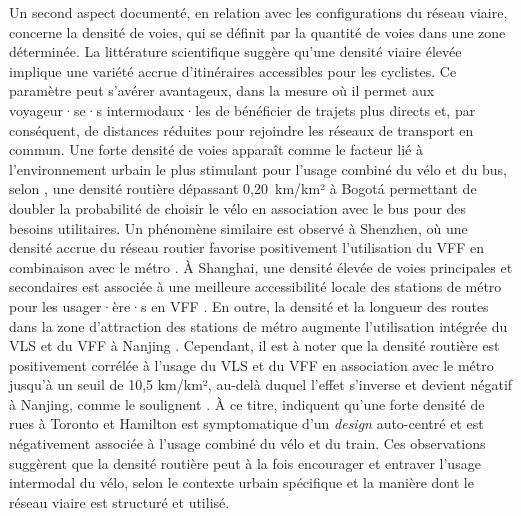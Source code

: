 \begin{refsegment}
Un second aspect documenté, en relation avec les configurations du réseau viaire, concerne la densité de voies, qui se définit par la quantité de voies dans une zone déterminée. La littérature scientifique suggère qu'une densité viaire élevée implique une variété accrue d'itinéraires accessibles pour les cyclistes. Ce paramètre peut s'avérer avantageux, dans la mesure où il permet aux voyageur·se·s intermodaux·les de bénéficier de trajets plus directs et, par conséquent, de distances réduites pour rejoindre les réseaux de transport en commun. Une forte densité de voies apparaît comme le facteur lié à l'environnement urbain le plus stimulant pour l'usage combiné du vélo et du bus, selon \textcolor{blue}{\textcite[219]{cervero_influences_2009}}, une densité routière dépassant 0,20~km/km² à Bogotá permettant de doubler la probabilité de choisir le vélo en association avec le bus pour des besoins utilitaires. Un phénomène similaire est observé à Shenzhen, où une densité accrue du réseau routier favorise positivement l'utilisation du \acrshort{VFF} en combinaison avec le métro \textcolor{blue}{\autocite[12]{wu_measuring_2019}}. À Shanghai, une densité élevée de voies principales et secondaires est associée à une meilleure accessibilité locale des stations de métro pour les usager·ère·s en \acrshort{VFF} \textcolor{blue}{\autocite[12]{hu_examining_2022}}. En outre, la densité et la longueur des routes dans la zone d'attraction des stations de métro augmente l'utilisation intégrée du \acrshort{VLS} et du \acrshort{VFF} à Nanjing \textcolor{blue}{\autocite[14]{chen_what_2022}}. Cependant, il est à noter que la densité routière est positivement corrélée à l'usage du \acrshort{VLS} et du \acrshort{VFF} en association avec le métro jusqu'à un seuil de 10,5 km/km², au-delà duquel l'effet s'inverse et devient négatif à Nanjing, comme le soulignent \textcolor{blue}{\textcite[6]{cheng_comparison_2023}}. À ce titre, \textcolor{blue}{\textcite[2171]{chan_factors_2020}} indiquent qu'une forte densité de rues à Toronto et Hamilton est symptomatique d'un \textsl{design} auto-centré et est négativement associée à l'usage combiné du vélo et du train. Ces observations suggèrent que la densité routière peut à la fois encourager et entraver l'usage intermodal du vélo, selon le contexte urbain spécifique et la manière dont le réseau viaire est structuré et utilisé.%


\end{refsegment}
